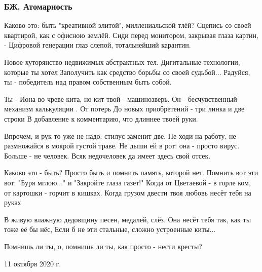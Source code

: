  
 
 

\subsubsection{БЖ. Атомарность}
\label{sec:poetry.rus.evgenija_bilchenko.atomarnost}

Каково это: быть "креативной элитой", миллениальской тлёй?
Сцепись со своей квартирой, как с офисною землёй.
Сиди перед монитором, закрывая глаза картин, -
Цифровой генерации глаз слепой, тотальнейший карантин.

Новое хуторянство недвижимых абстрактных тел.
Дигитальные технологии, которые ты хотел
Заполучить как средство борьбы со своей судьбой...
Радуйся, ты - победитель над правом собственным быть собой.

Ты - Иона во чреве кита, но кит твой - машинозверь.
Он - бесчувственный механизм калькуляции . От потерь
До новых приобретений - три линка и две строки
В добавление к комментарию, что длиннее твоей руки.

Впрочем, и рук-то уже не надо: стилус заменит две.
Не ходи на работу, не размножайся в мокрой густой траве.
Не дыши ей в рот: она - просто вирус. Больше - не человек.
Всяк недочеловек да имеет здесь свой отсек.

Каково это - быть? Просто быть и помнить память, которой нет.
Помнить вот эти вот: "Буря мглою..." и "Закройте глаза газет!"
Когда от Цветаевой - в горле ком, от картошки - горчит в кишках.
Когда грузом двести твоя любовь несёт тебя на руках

В живую влажную дедовщину песен, медалей, слёз.
Она несёт тебя так, как ты тоже её бы нёс,
Если б не эти стальные, сложно устроенные киты...

Помнишь ли ты, о, помнишь ли ты, как просто - нести кресты?

11 октября 2020 г.
